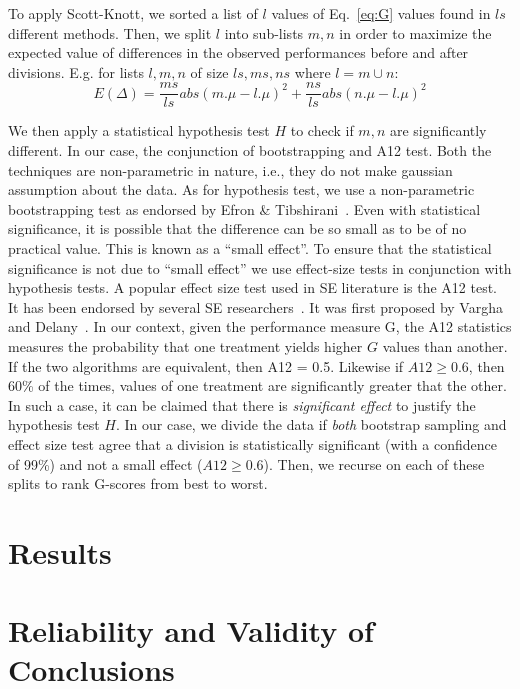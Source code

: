 \documentclass[sigconf, proceedings, 9pt]{acmart}
\newcommand{\eq}[1]{Eq.~\ref{eq:#1}}
\begin{document}
To  apply Scott-Knott, we sorted a list of  $l$ values of \eq{G} 
values found in $ls$ different methods. Then, we split $l$ into 
sub-lists $m,n$ in order to maximize the expected value of differences in 
the observed performances before and after divisions. E.g. for lists 
$l,m,n$ of size $ls,ms,ns$ where $l=m\cup n$: 
\[E(\Delta)=\frac{ms}{ls}abs(m.\mu - l.\mu)^2 + \frac{ns}{ls}abs(n.\mu - 
l.\mu)^2\] 


We then apply a statistical hypothesis test $H$ to check
if $m,n$ are significantly different. In our case, the conjunction of 
bootstrapping and A12 test. Both the techniques are non-parametric in nature, 
i.e., they do not make gaussian assumption about the data. As for hypothesis 
test, we use a non-parametric bootstrapping test as endorsed by Efron \& 
Tibshirani~\cite[p220-223]{efron93}. Even with statistical significance, it is 
possible that the difference
	can be so small as to be of no practical value. This is known as a ``small 
	effect''. To ensure that the statistical significance is not due to ``small 
	effect'' we use effect-size tests in conjunction with hypothesis tests. A 
	popular effect size test used in SE literature is the A12 test. It has been 
	endorsed by several SE researchers~\cite{leech2002call, poulding10, arcuri11, 
	shepperd12a, kampenes07, Kocaguneli2013:ep}. It was first proposed by Vargha 
	and Delany~\cite{vargha2000}. In our context,
	given the performance measure 
	G, the A12 statistics measures the
	probability that one treatment yields higher $G$ values than another. If the 
	two algorithms are equivalent, then A12 = 0.5. Likewise if $A12 \ge 0.6$, then 
	60\% of the times, values of one treatment are significantly greater that the 
	other. In such a case, it can be claimed that there is \textit{significant 
	effect} to justify the hypothesis test $H$. In our case, we divide the data if 
	\textit{both} bootstrap sampling and effect size test agree that a division is 
	statistically significant (with a
	confidence of 99\%) and not a small effect ($A12 \ge 0.6$). Then, we recurse 
	on each of these splits to rank G-scores from best to worst.



\section{Results}
\label{sect:results}

	\section{Reliability and Validity of Conclusions}
\end{document}
